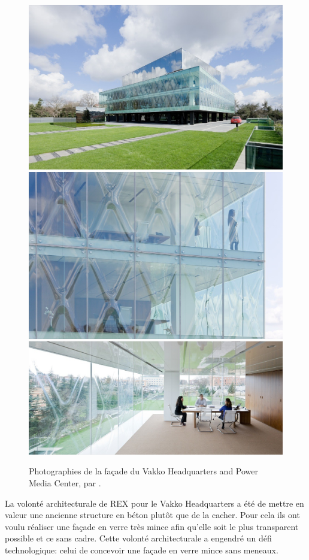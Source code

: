 \documentclass[11pt,titlepage]{article}
\begin{document}
\begin{figure}[H]
    \centering
    \includegraphics[height=0.324\linewidth]{img/bulle/Vakko_ext2.jpg}\hfill
    \includegraphics[height=0.324\linewidth]{img/bulle/Vakko_ext.jpg}
    \\[\smallskipamount]
    \includegraphics[width=\linewidth]{img/bulle/Vakko_int.jpg}
    \caption{Photographies de la façade du Vakko Headquarters and Power Media Center, par \cite{VekkoHQ}.}
    \label{fig:VakkoHQ}
\end{figure}

La volonté architecturale de REX pour le Vakko Headquarters a été de mettre en valeur une ancienne structure en béton plutôt que de la cacher. Pour cela ils ont voulu réaliser une façade en verre très mince afin qu'elle soit le plus transparent possible et ce sans cadre. Cette volonté architecturale a engendré un défi technologique: celui de concevoir une façade en verre mince sans meneaux. 
\end{document}
